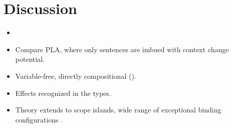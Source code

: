 \section{Discussion}
\begin{itemize}
	\item 
	
	\item Compare PLA, where only sentences are imbued with context change potential. %
	
	\item Variable-free, directly compositional (\citealt{Jacobson:1999}).
	
	\item Effects recognized in the types. 
	
	\item Theory extends to scope islands, wide range of exceptional binding configurations \citealt{Charlow:diss}. %
\end{itemize}

\citealt{Groote:2001}
\citealt{Bumford:inc}

{\small}
